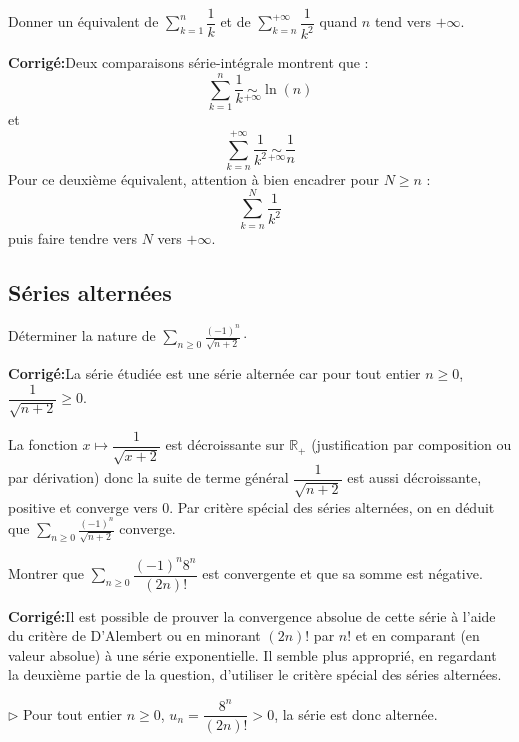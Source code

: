 \documentclass[a4paper,twoside,french,10pt]{VcCours}
\newcommand{\corr}{\textbf{Corrigé:}}
\newcommand{\Sum}[2]{\ensuremath{\textstyle{\sum\limits_{#1}^{#2}}}}
\begin{document}
\medskip

\begin{Exercice}{}\label{harm} Donner un équivalent de $\Sum{k=1}n \dfrac{1}{k}$ et de $\Sum{k=n}{+ \infty} \dfrac{1}{k^2}$ quand $n$ tend vers $+ \infty$.
\end{Exercice} 

\corr Deux comparaisons série-intégrale montrent que :
$$ \sum_{k=1}^n \dfrac{1}{k} \underset{+ \infty}{\sim} \ln(n) $$
et 
$$ \sum_{k=n}^{+ \infty} \dfrac{1}{k^2} \underset{+ \infty}{\sim} \dfrac{1}{n} $$
Pour ce deuxième équivalent, attention à bien encadrer pour $N \geq n$ :
$$ \sum_{k=n}^N \dfrac{1}{k^2}$$
puis faire tendre vers $N$ vers $+ \infty$.

\medskip

\subsection{Séries alternées}

\medskip

\begin{Exercice}{} Déterminer la nature de $\Sum{n \geq 0}{} \frac{(-1)^n}{\sqrt{n+2}}\cdot$
\end{Exercice}

\corr La série étudiée est une série alternée car pour tout entier $n \geq 0$, $\dfrac{1}{\sqrt{n+2}} \geq 0$.


\noindent La fonction $x \mapsto \dfrac{1}{\sqrt{x+2}}$ est décroissante sur $\mathbb{R}_+$ (justification par composition ou par dérivation) donc la suite de terme général $\dfrac{1}{\sqrt{n+2}}$ est aussi décroissante, positive et converge vers $0$. Par critère spécial des séries alternées, on en déduit que $\Sum{n \geq 0}{} \frac{(-1)^n}{\sqrt{n+2}}$ converge.

\medskip

\begin{Exercice}{} Montrer que $\Sum{n \geq 0}{} {\dfrac{( - 1)^n 8^n}{(2n)!}}$ est convergente et que sa somme est négative. \end{Exercice}

\corr Il est possible de prouver la convergence absolue de cette série à l'aide du critère de D'Alembert ou en minorant $(2n)!$ par $n!$ et en comparant (en valeur absolue) à une série exponentielle. Il semble plus approprié, en regardant la deuxième partie de la question, d'utiliser le critère spécial des séries alternées.

\medskip

\noindent $\rhd$ Pour tout entier $n \geq 0$, $u_n = \dfrac{ 8^n}{(2n)!} > 0$, la série est donc alternée. 
\end{document}
